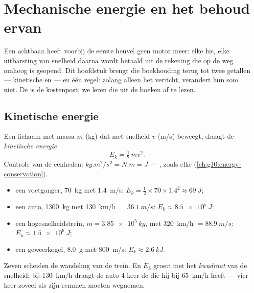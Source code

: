 \chapter{Mechanische energie en het behoud ervan}\label{ch:g11:mechanical-energy}

Een achtbaan heeft voorbij de eerste heuvel geen motor meer: elke lus,
elke uitbarsting van snelheid daarna wordt betaald uit de rekening die op
de weg omhoog is geopend. Dit hoofdstuk brengt die boekhouding terug tot
twee getallen --- kinetische en  --- en één regel:
zolang alleen het   verricht, verandert hun som niet. De
 is de kostenpost; we leren die uit de boeken af te lezen.

\section{Kinetische energie}

\begin{definition}\label{def:g11:mechanical-energy:kinetic}
Een lichaam met massa $m$ (\unit{kg}) dat met snelheid $v$ (\unit{m/s})
beweegt, draagt de \emph{kinetische energie}
\[
E_k = \tfrac12\, m v^2 .
\]
Controle van de eenheden: $\unit{kg.m^2/s^2} = \unit{N.m} = \unit{J}$ ---
, zoals elke  (\cref{ch:g10:energy-conservation}).
\end{definition}

\begin{example}[Ordegrootten]\label{ex:g11:mechanical-energy:orders}
\begin{itemize}
  \item een voetganger, \qty{70}{kg} met \qty{1.4}{m/s}:
        $E_k = \tfrac12 \times 70 \times 1.4^2 \approx \qty{69}{J}$;
  \item een auto, \qty{1300}{kg} met \qty{130}{km/h} $= \qty{36.1}{m/s}$:
        $E_k \approx \qty{8.5e5}{J}$;
  \item een hogesnelheidstrein, $m = \qty{3.85e5}{kg}$, met
        \qty{320}{km/h} $= \qty{88.9}{m/s}$: $E_k \approx \qty{1.5e9}{J}$;
  \item een geweerkogel, \qty{8.0}{g} met \qty{800}{m/s}:
        $E_k \approx \qty{2.6}{kJ}$.
\end{itemize}
Zeven  scheiden de wandeling van de trein. En $E_k$ groeit
met het \emph{kwadraat} van de snelheid: bij \qty{130}{km/h} draagt de
auto $4$ keer de  die hij bij \qty{65}{km/h} heeft --- vier keer
zoveel als zijn remmen moeten wegnemen.
\end{example}

